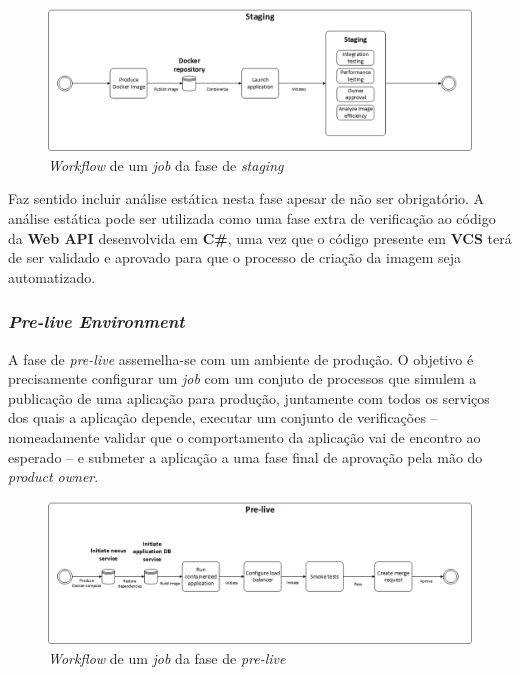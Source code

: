 \begin{figure}[hbt!]
\centering
\includegraphics[width=0.8\linewidth]{Cap2/Staging.png}
\caption{\textit{Workflow} de um \textit{job} da fase de \textit{staging}}
\label{Fig:Fig100}
\end{figure}

\hspace{1cm}Faz sentido incluir análise estática nesta fase apesar de não ser obrigatório. A análise estática pode ser utilizada como uma fase extra de verificação ao código da \textbf{Web API} desenvolvida em \textbf{C\#}, uma vez que o código presente em \textbf{VCS} terá de ser validado e aprovado para que o processo de criação da imagem seja automatizado.

\subsubsection{\textit{Pre-live Environment}}

\hspace{1cm}A fase de \textit{pre-live} assemelha-se com um ambiente de produção. O objetivo é precisamente configurar um \textit{job} com um conjuto de processos que simulem a publicação de uma aplicação para produção, juntamente com todos os serviços dos quais a aplicação depende, executar um conjunto de verificações -- nomeadamente validar que o comportamento da aplicação vai de encontro ao esperado -- e submeter a aplicação a uma fase final de aprovação pela mão do \textit{product owner}.

\begin{figure}[hbt!]
\centering
\includegraphics[width=0.8\linewidth]{Cap2/PreLiveStage.png}
\caption{\textit{Workflow} de um \textit{job} da fase de \textit{pre-live}}
\label{Fig:Fig97}
\end{figure}

